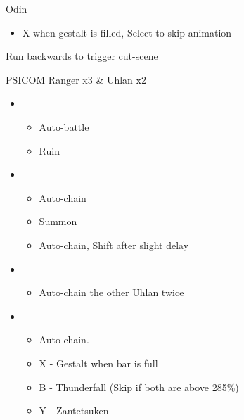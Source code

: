\begin{multicols}{2}
\begin{battle}[0:52]{Odin}
\begin{itemize}
			\item X when gestalt is filled, Select to skip animation
		\end{itemize}
	\end{battle}
	Run backwards to trigger cut-scene
	\vfill
	\begin{battle}[0:35]{PSICOM Ranger x3 \& Uhlan x2}
		\begin{itemize}
			\item \second
			      \begin{itemize}
				      \item Auto-battle
				      \item Ruin
			      \end{itemize}
			\item \fourth
			      \begin{itemize}
				      \item Auto-chain
				      \item Summon
				      \item Auto-chain, Shift after slight delay
			      \end{itemize}
			\item \fifth
			      \begin{itemize}
				      \item Auto-chain the other Uhlan twice
			      \end{itemize}
			\item \fourth
			      \begin{itemize}
				      \item Auto-chain.
				      \item X - Gestalt when bar is full
				      \item B - Thunderfall (Skip if both are above 285\%)
				      \item Y - Zantetsuken
			      \end{itemize}
		\end{itemize}
		 
	\end{battle}




\end{multicols}

